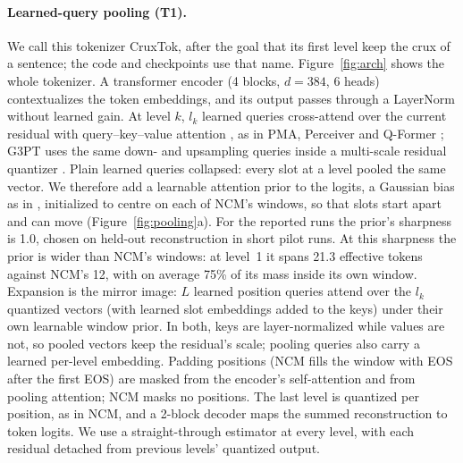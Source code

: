 \documentclass[11pt]{article}
\begin{document}
\paragraph{Learned-query pooling (T1).} We call this tokenizer CruxTok, after the goal that its first level keep the crux of a sentence; the code and checkpoints use that name. Figure~\ref{fig:arch} shows the whole tokenizer. A transformer encoder (4 blocks, $d{=}384$, 6 heads) contextualizes the token embeddings, and its output passes through a LayerNorm without learned gain. At level $k$, $l_k$ learned queries cross-attend over the current residual with query--key--value attention \citep{vaswani2017attention}, as in PMA, Perceiver and Q-Former \citep{lee2019set,jaegle2021perceiver,li2023blip2}; G3PT uses the same down- and upsampling queries inside a multi-scale residual quantizer \citep{zhang2025g3pt}. Plain learned queries collapsed: every slot at a level pooled the same vector. We therefore add a learnable attention prior to the logits, a Gaussian bias as in \citet{yang2018localness}, initialized to centre on each of NCM's windows, so that slots start apart and can move (Figure~\ref{fig:pooling}a). For the reported runs the prior's sharpness is 1.0, chosen on held-out reconstruction in short pilot runs. At this sharpness the prior is wider than NCM's windows: at level~1 it spans 21.3 effective tokens against NCM's 12, with on average 75\% of its mass inside its own window. Expansion is the mirror image: $L$ learned position queries attend over the $l_k$ quantized vectors (with learned slot embeddings added to the keys) under their own learnable window prior. In both, keys are layer-normalized while values are not, so pooled vectors keep the residual's scale; pooling queries also carry a learned per-level embedding. Padding positions (NCM fills the window with EOS after the first EOS) are masked from the encoder's self-attention and from pooling attention; NCM masks no positions. The last level is quantized per position, as in NCM, and a 2-block decoder maps the summed reconstruction to token logits. We use a straight-through estimator \citep{bengio2013ste} at every level, with each residual detached from previous levels' quantized output.
\end{document}
